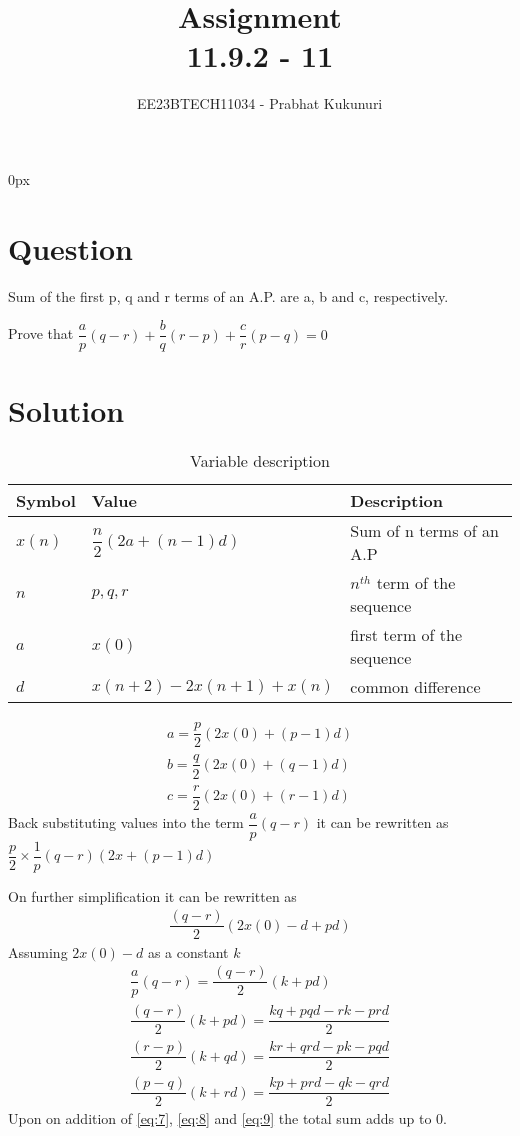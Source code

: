 \documentclass[journal,12pt,twocolumn]{IEEEtran}
\theoremstyle{remark}
\begin{document}
\parindent 0px


\vspace{3cm}

\title{Assignment\\[1ex]11.9.2 - 11}
\author{EE23BTECH11034 - Prabhat Kukunuri$^{}$%
}
\maketitle
\newpage
\bigskip

\renewcommand{\thefigure}{\theenumi}
\renewcommand{\thetable}{\theenumi}
\section*{Question}
Sum of the first p, q and r terms of an A.P. are a, b and c, respectively.

Prove that $\dfrac{a}{p}(q-r)+\dfrac{b}{q}(r-p)+\dfrac{c}{r}(p-q)=0$
\section*{Solution}
\begin{table}[h]
    \centering
    \begin{tabular}{|p{2.5cm}|p{2.5cm}|p{2.5cm}|}
    \hline
   Symbol&Value&Description\\ \hline
   $x(n)$&{$\dfrac{n}{2}(2a+(n-1)d)$}&Sum of n terms of an A.P\\ \hline
   $n$&$p,q,r$&$n^{th}$ term of the sequence\\ \hline
   $a$&$x(0)$&first term of the sequence\\ \hline
   $d$&\tiny$x(n+2)-2x(n+1)+x(n)$&common difference\\ \hline

    \end{tabular}
    \caption{Variable description}
    \label{tab:11.9.2.11}
\end{table}
\begin{align}
    a=\dfrac{p}{2}(2x(0)+(p-1)d)\\
    b=\dfrac{q}{2}(2x(0)+(q-1)d)\\
    c=\dfrac{r}{2}(2x(0)+(r-1)d)
\end{align}
Back substituting values into the term $\dfrac{a}{p}(q-r)$ it can be rewritten as $\dfrac{p}{2} \times \dfrac{1}{p}(q-r)(2x+(p-1)d)$

On further simplification it can be rewritten as 
\begin{align}
    \dfrac{(q-r)}{2}(2x(0)-d+pd)
\end{align}
Assuming $2x(0)-d$ as a constant $k$
\begin{align}
    \dfrac{a}{p}(q-r) = \dfrac{(q-r)}{2}(k+pd)\\
    \dfrac{(q-r)}{2}(k+pd) = \dfrac{kq+pqd-rk-prd}{2}\label{eq:7}\\
    \dfrac{(r-p)}{2}(k+qd) = \dfrac{kr+qrd-pk-pqd}{2}\label{eq:8}\\
    \dfrac{(p-q)}{2}(k+rd) = \dfrac{kp+prd-qk-qrd}{2}\label{eq:9}
\end{align}
Upon on addition of \eqref{eq:7}, \eqref{eq:8} and \eqref{eq:9} the total sum adds up to 0.
\end{document}
